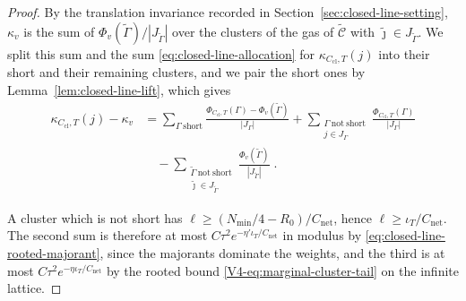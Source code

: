 \documentclass[11pt]{article}
\numberwithin{equation}{section}
\theoremstyle{remark}
\theoremstyle{plain}
\begin{document}
\begin{proof}
By the translation invariance recorded in Section~\ref{sec:closed-line-setting}, $\kappa_v$ is the sum of $\Phi_v(\widetilde\Gamma)/| J_{\widetilde\Gamma}|$ over the clusters of the gas of $\widetilde{\mathcal C}$ with $\tilde\jmath\in J_{\widetilde\Gamma}$. We split this sum and the sum \eqref{eq:closed-line-allocation} for $\kappa_{C_{\mathrm{cl}},T}(j)$ into their short and their remaining clusters, and we pair the short ones by Lemma~\ref{lem:closed-line-lift}, which gives
\begin{equation}\label{eq:closed-line-three-terms}
    \begin{aligned}
        \kappa_{C_{\mathrm{cl}},T}(j)-\kappa_v
            &=\sum_{\Gamma\ \mathrm{short}}\frac{\Phi_{C_{\mathrm{cl}},T}(\Gamma)-\Phi_v(\widetilde\Gamma)}{| J_{\Gamma}|}
            +\sum_{\substack{\Gamma\ \mathrm{not\ short}\\ j\in J_{\Gamma}}}\frac{\Phi_{C_{\mathrm{cl}},T}(\Gamma)}{| J_{\Gamma}|}\\
            &\quad-\sum_{\substack{\widetilde\Gamma\ \mathrm{not\ short}\\ \tilde\jmath\in J_{\widetilde\Gamma}}}\frac{\Phi_v(\widetilde\Gamma)}{| J_{\widetilde\Gamma}|}\;.
    \end{aligned}
\end{equation}

A cluster which is not short has $\ell\geqslant (N_{\min}/4-R_0)/C_{\mathrm{net}}$, hence $\ell\geqslant \iota_T/C_{\mathrm{net}}$. The second sum is therefore at most $C\tau^2e^{-\eta'\iota_T/C_{\mathrm{net}}}$ in modulus by \eqref{eq:closed-line-rooted-majorant}, since the majorants dominate the weights, and the third is at most $C\tau^2e^{-\eta\iota_T/C_{\mathrm{net}}}$ by the rooted bound \eqref{V4-eq:marginal-cluster-tail} on the infinite lattice.


\end{proof}
\end{document}
